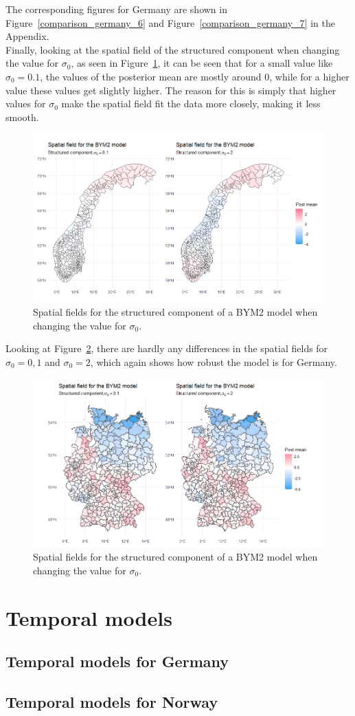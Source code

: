 The corresponding figures for Germany are shown in Figure~\ref{comparison_germany_6} and Figure~\ref{comparison_germany_7} in the Appendix. \\
Finally, looking at the spatial field of the structured component when changing the value for $\sigma_0$, as seen in Figure~\ref{comparison_norway_8}, it can be seen that for a small value like $\sigma_0 = 0.1$, the values of the posterior mean are mostly around 0, while for a higher value these values get slightly higher. The reason for this is simply that higher values for $\sigma_0$ make the spatial field fit the data more closely, making it less smooth.
\begin{figure}[H]
  \centering
  \includegraphics[width = \textwidth]{spatial_field_norway_3.png}
  \caption{Spatial fields for the structured component of a BYM2 model when changing the value for $\sigma_0$.}
  \label{comparison_norway_8}
\end{figure}
Looking at Figure~\ref{comparison_germany_8}, there are hardly any differences in the spatial fields for $\sigma_0=0,1$ and $\sigma_0=2$, which again shows how robust the model is for Germany.
\begin{figure}[H]
    \centering
    \includegraphics[width = \textwidth]{spatial_field_germany_3.png}
    \caption{Spatial fields for the structured component of a BYM2 model when changing the value for $\sigma_0$.}
    \label{comparison_germany_8}
\end{figure}

\clearpage
\section{Temporal models}
\subsection{Temporal models for Germany}
\subsection{Temporal models for Norway}